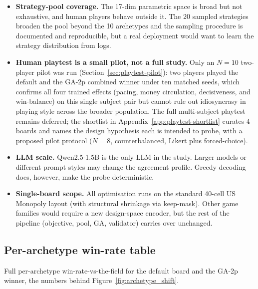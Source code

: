 \documentclass[10pt]{article}
\begin{document}
\begin{itemize}[leftmargin=1.2em,itemsep=1pt]
\item \textbf{Strategy-pool coverage.} The 17-dim parametric space
is broad but not exhaustive, and human players behave outside it.
The 20 sampled strategies broaden the pool beyond the 10
archetypes and the sampling procedure is documented and
reproducible, but a real deployment would want to learn the
strategy distribution from logs.
\item \textbf{Human playtest is a small pilot, not a full study.}
Only an $N{=}10$ two-player pilot was run
(Section~\ref{sec:playtest-pilot}): two players played the default
and the GA-2p combined winner under ten matched seeds, which
confirms all four trained effects (pacing, money circulation,
decisiveness, and win-balance) on this single subject pair but
cannot rule out idiosyncrasy in playing style across the broader
population. The full multi-subject playtest remains deferred; the
shortlist in Appendix~\ref{app:playtest-shortlist} curates 4
boards and names the design hypothesis each is intended to probe,
with a proposed pilot protocol ($N{=}8$, counterbalanced, Likert
plus forced-choice).
\item \textbf{LLM scale.} Qwen2.5-1.5B is the only LLM in the
study. Larger models or different prompt styles may change the
agreement profile. Greedy decoding does, however, make the probe
deterministic.
\item \textbf{Single-board scope.} All optimisation runs on the
standard 40-cell US Monopoly layout (with structural shrinkage
via keep-mask). Other game families would require a new
design-space encoder, but the rest of the pipeline (objective,
pool, GA, validator) carries over unchanged.
\end{itemize}

\subsection{Per-archetype win-rate table}\label{app:archetypes}

Full per-archetype win-rate-vs-the-field for the default board and the
GA-2p winner, the numbers behind Figure~\ref{fig:archetype_shift}.
\end{document}
